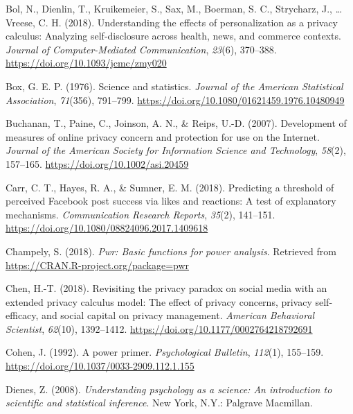 \documentclass[
  english,
  man,floatsintext]{apa6}
\begin{document}
\leavevmode\hypertarget{ref-bolUnderstandingEffectsPersonalization2018}{}%
Bol, N., Dienlin, T., Kruikemeier, S., Sax, M., Boerman, S. C., Strycharz, J., \ldots{} Vreese, C. H. (2018). Understanding the effects of personalization as a privacy calculus: Analyzing self-disclosure across health, news, and commerce contexts. \emph{Journal of Computer-Mediated Communication}, \emph{23}(6), 370--388. \url{https://doi.org/10.1093/jcmc/zmy020}

\leavevmode\hypertarget{ref-boxScienceStatistics1976}{}%
Box, G. E. P. (1976). Science and statistics. \emph{Journal of the American Statistical Association}, \emph{71}(356), 791--799. \url{https://doi.org/10.1080/01621459.1976.10480949}

\leavevmode\hypertarget{ref-buchananDevelopmentMeasuresOnline2007}{}%
Buchanan, T., Paine, C., Joinson, A. N., \& Reips, U.-D. (2007). Development of measures of online privacy concern and protection for use on the Internet. \emph{Journal of the American Society for Information Science and Technology}, \emph{58}(2), 157--165. \url{https://doi.org/10.1002/asi.20459}

\leavevmode\hypertarget{ref-carrPredictingThresholdPerceived2018}{}%
Carr, C. T., Hayes, R. A., \& Sumner, E. M. (2018). Predicting a threshold of perceived Facebook post success via likes and reactions: A test of explanatory mechanisms. \emph{Communication Research Reports}, \emph{35}(2), 141--151. \url{https://doi.org/10.1080/08824096.2017.1409618}

\leavevmode\hypertarget{ref-R-pwr}{}%
Champely, S. (2018). \emph{Pwr: Basic functions for power analysis}. Retrieved from \url{https://CRAN.R-project.org/package=pwr}

\leavevmode\hypertarget{ref-chenRevisitingPrivacyParadox2018}{}%
Chen, H.-T. (2018). Revisiting the privacy paradox on social media with an extended privacy calculus model: The effect of privacy concerns, privacy self-efficacy, and social capital on privacy management. \emph{American Behavioral Scientist}, \emph{62}(10), 1392--1412. \url{https://doi.org/10.1177/0002764218792691}

\leavevmode\hypertarget{ref-cohenPowerPrimer1992}{}%
Cohen, J. (1992). A power primer. \emph{Psychological Bulletin}, \emph{112}(1), 155--159. \url{https://doi.org/10.1037/0033-2909.112.1.155}

\leavevmode\hypertarget{ref-dienesUnderstandingPsychologyScience2008}{}%
Dienes, Z. (2008). \emph{Understanding psychology as a science: An introduction to scientific and statistical inference}. New York, N.Y.: Palgrave Macmillan.
\end{document}
